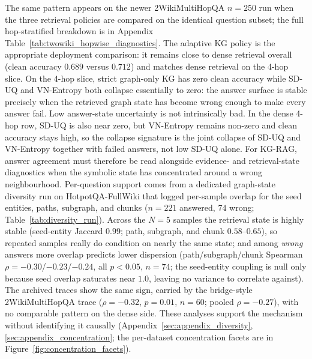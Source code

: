 The same pattern appears on the newer 2WikiMultiHopQA $n=250$ run when the
three retrieval policies are compared on the identical question subset; the
full hop-stratified breakdown is in Appendix
Table~\ref{tab:twowiki_hopwise_diagnostics}.
The adaptive KG policy is the appropriate deployment comparison: it remains
close to dense retrieval overall (clean accuracy $0.689$ versus $0.712$) and
matches dense retrieval on the 4-hop slice.
On the 4-hop slice, strict graph-only KG has zero clean accuracy while
SD-UQ and VN-Entropy both collapse essentially to zero: the answer surface is
stable precisely when the retrieved graph state has become wrong enough to
make every answer fail.
Low answer-state uncertainty is not intrinsically bad. In the dense 4-hop row,
SD-UQ is also near zero, but VN-Entropy remains non-zero and clean accuracy
stays high, so the collapse signature is the joint collapse of SD-UQ and
VN-Entropy together with failed answers, not low SD-UQ alone.
For KG-RAG, answer agreement must therefore be read alongside evidence- and
retrieval-state diagnostics when the symbolic state has concentrated around a
wrong neighbourhood.
Per-question support comes from a dedicated graph-state diversity run on
HotpotQA-FullWiki that logged per-sample overlap for the seed entities, paths,
subgraph, and chunks ($n=221$ answered, $74$ wrong; Table~\ref{tab:diversity_run}).
Across the $N=5$ samples the retrieval state is highly stable
(seed-entity Jaccard $0.99$; path, subgraph, and chunk $0.58$--$0.65$), so
repeated samples really do condition on nearly the same state; and among
\emph{wrong} answers more overlap predicts lower dispersion
(path/subgraph/chunk Spearman $\rho = -0.30$/$-0.23$/$-0.24$, all $p<0.05$,
$n=74$; the seed-entity coupling is null only because seed overlap saturates
near $1.0$, leaving no variance to correlate against).
The archived traces show the same sign, carried by the bridge-style
2WikiMultiHopQA trace ($\rho = -0.32$, $p = 0.01$, $n = 60$; pooled
$\rho = -0.27$), with no comparable pattern on the dense side.
These analyses support the mechanism without identifying it causally
(Appendix~\ref{sec:appendix_diversity}, \ref{sec:appendix_concentration};
the per-dataset concentration facets are in Figure~\ref{fig:concentration_facets}).


